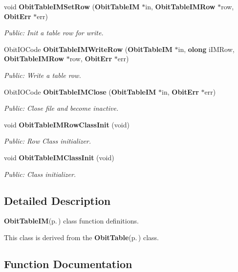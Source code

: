 \begin{CompactItemize}
void {\bf Obit\-Table\-IMSet\-Row} ({\bf Obit\-Table\-IM} $\ast$in, {\bf Obit\-Table\-IMRow} $\ast$row, {\bf Obit\-Err} $\ast$err)
\begin{CompactList}\small\item\em Public: Init a table row for write. \item\end{CompactList}\item 
Obit\-IOCode {\bf Obit\-Table\-IMWrite\-Row} ({\bf Obit\-Table\-IM} $\ast$in, {\bf olong} i\-IMRow, {\bf Obit\-Table\-IMRow} $\ast$row, {\bf Obit\-Err} $\ast$err)
\begin{CompactList}\small\item\em Public: Write a table row. \item\end{CompactList}\item 
Obit\-IOCode {\bf Obit\-Table\-IMClose} ({\bf Obit\-Table\-IM} $\ast$in, {\bf Obit\-Err} $\ast$err)
\begin{CompactList}\small\item\em Public: Close file and become inactive. \item\end{CompactList}\item 
void {\bf Obit\-Table\-IMRow\-Class\-Init} (void)
\begin{CompactList}\small\item\em Public: Row Class initializer. \item\end{CompactList}\item 
void {\bf Obit\-Table\-IMClass\-Init} (void)
\begin{CompactList}\small\item\em Public: Class initializer. \item\end{CompactList}\end{CompactItemize}


\subsection{Detailed Description}
{\bf Obit\-Table\-IM}{\rm (p.\,\pageref{structObitTableIM})} class function definitions. 

This class is derived from the {\bf Obit\-Table}{\rm (p.\,\pageref{structObitTable})} class.

\subsection{Function Documentation}
